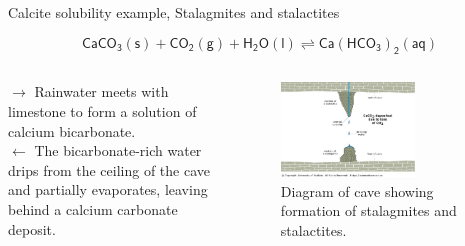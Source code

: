 %
%
\begin{frame}{Calcite solubility example, Stalagmites and stalactites}

\[\mathsf{CaCO_3(s) + CO_2(g) + H_2O(l) \rightleftharpoons Ca(HCO_3)_2(aq)}\]

\vskip -10pt
\begin{columns}[t]
\vskip 10pt
$\rightarrow$ Rainwater meets with limestone to form a solution of calcium bicarbonate. \\[5pt]
$\leftarrow$ The bicarbonate-rich water drips from the ceiling of the cave and partially evaporates, leaving behind a calcium carbonate deposit.


\begin{figure}\centering
\includegraphics[width=0.7\textwidth]{figures/chemical-equilibrium/stalagmites-stalactities.jpg}
\caption{\footnotesize
Diagram of cave showing formation of stalagmites and stalactites.}
\end{figure}

\end{columns}

\end{frame}
%
%
